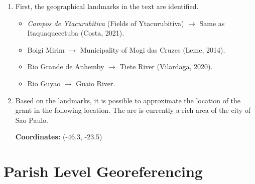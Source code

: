 \documentclass[11pt]{article}
\begin{document}
\begin{enumerate}
    \item First, the geographical landmarks in the text are identified.
    \begin{figure}[h!]
        \begin{center}
        \vspace{3mm}
        \end{center}
    \end{figure}
    \begin{itemize}
        \item \textit{Campos de Ytacurubitiva} (Fields of Ytacurubitiva) $\rightarrow$ Same as Itaquaquecetuba (Costa, 2021).
        \item Boigi Mirim $\rightarrow$ Municipality of Mogi das Cruzes (Leme, 2014).
        \item Rio Grande de Anhemby $\rightarrow$ Tiete River (Vilardaga, 2020).
        \item Rio Guyao $\rightarrow$ Guaio River.
    \end{itemize}
    \item Based on the landmarks, it is possible to approximate the location of the grant in the following location. The are is currently a rich area of the city of Sao Paulo.
    \begin{figure}[h!]
        \begin{center}
        \vspace{3mm}
        \end{center}
    \end{figure}  

    \centering
    \textbf{Coordinates:} (-46.3, -23.5)
\end{enumerate}


\clearpage

\section{Parish Level Georeferencing}
\label{app:georeferencing_parishes}
\end{document}
